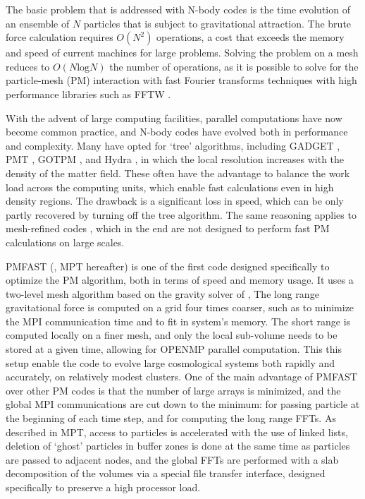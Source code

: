 \documentclass[useAMS,usenatbib]{mn2e}
\begin{document}
The basic problem that is addressed with N-body codes is the time evolution of an ensemble of $N$ particles
that is subject to gravitational attraction. The brute force calculation requires $O(N^{2})$ operations, a cost that 
exceeds the memory and speed of current machines for large problems.
Solving the problem  on a mesh \citep{1981csup.book.....H} reduces to $O(N\mbox{log}N)$ the number of operations,
as it is possible to solve for the particle-mesh (PM) interaction with fast Fourier transforms techniques with high performance libraries such as {\small FFTW} \citep{FFTW3}.


With the advent of large computing facilities, parallel computations have now become 
common practice, and N-body codes have evolved both in performance and complexity. 
Many have opted for  `tree' algorithms, including {\small GADGET} \citep{2001NewA....6...79S, 2005MNRAS.364.1105S}, {\small PMT} \citep{1995ApJS...98..355X}, {\small GOTPM} \citep{2004NewA....9..111D}, and Hydra \citep{1995ApJ...452..797C}, in which the local resolution increases with the density of the matter field. 
These often have the advantage to balance the work load across the computing units, which enable fast calculations even in high density regions. 
The drawback is a significant loss in speed, which can be only partly recovered by turning off the tree algorithm. 
The same reasoning applies to mesh-refined codes  \citep{1991ApJ...368L..23C}, 
which in the end are not designed to perform fast PM calculations on large scales. 



{\small PMFAST} (\cite{2005NewA...10..393M}, MPT hereafter) is one of the first code designed specifically to optimize the PM algorithm,
both in terms of speed and memory usage. It uses a two-level mesh algorithm based on the gravity solver of \cite{2003AAS...203.9703T},
The long range gravitational force is computed on a  grid four times coarser, such as to minimize the {\small MPI} communication time
and to fit in system's memory. The short range is computed locally on a finer mesh, and only the local sub-volume needs 
to be stored at a given time, allowing for {\small OPENMP} parallel computation.
This this setup enable the code to evolve large cosmological systems both rapidly and accurately, on relatively modest clusters.
One of the main advantage of {\small PMFAST} over other PM codes is that the number of large arrays is minimized,
and the global {\small MPI} communications are cut down to the minimum: for passing particle at the beginning of each time step,
and  for computing the long range FFTs.
As described in MPT, access to particles is accelerated with the use of linked lists, deletion of `ghost' particles
in buffer zones is done at the same time as particles are passed to adjacent nodes,
and the global FFTs are performed with a slab decomposition of the volumes via a special file transfer interface, 
designed specifically to preserve a high processor load.
\end{document}
